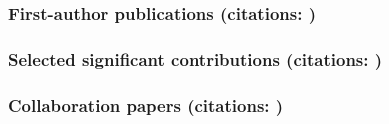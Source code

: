 \documentclass[12pt,letterpaper]{article}
\begin{document}
  \subsubsection{First-author publications (citations: \firstcites)}
\begin{list}{}{\cvlist}
  
\end{list}

\subsubsection{Selected significant contributions (citations: \sigcites)}
\begin{list}{}{\cvlist}
  \ifdefined\withfull
    
  \else
    
  \fi
\end{list}

\subsubsection{Collaboration papers (citations: \collabcites)}
\begin{list}{}{\cvlist}
  
\end{list}
\fi
\end{document}
